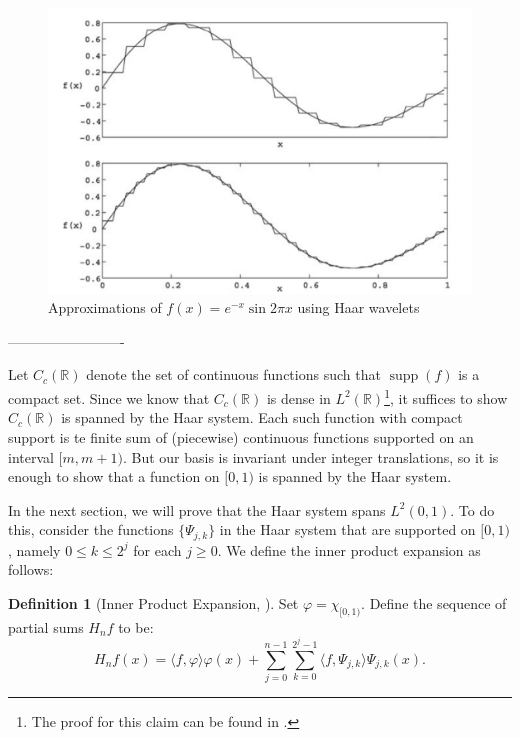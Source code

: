 \documentclass[2pt]{amsart}
\author{Jason Ngo}
\theoremstyle{theorem} %
\theoremstyle{definition}
\newtheorem{defn}[thm]{Definition}
\theoremstyle{example}
\theoremstyle{remark}
\numberwithin{equation}{section}
\newcommand{\R}{\mathbb{R}}
\DeclareMathOperator*{\supp}{supp}
\begin{document}
	
	
	\begin{figure}
		\centering
		\includegraphics[width=0.7\linewidth]{img/approximations}
		\caption{Approximations of $ f(x) = e^{-x} \sin{2\pi x} $ using Haar wavelets \cite{lepik}}
		\label{fig:approximations}
	\end{figure}
	
	
	-------------------------
	
	Let $ C_c (\R) $ denote the set of continuous functions such that $ \supp(f) $ is a compact set.
	Since we know that $ C_c(\R) $ is dense in $ L^2(\R) $\footnote{The proof for this claim can be found in \cite[326]{farrell}.}, it suffices to show $ C_c (\R) $ is spanned by the Haar system. Each such function with compact support is te finite sum of (piecewise) continuous functions supported on an interval $ [m, m+1) $. But our basis is invariant under integer translations, so it is enough to show that a function on $ [0,1) $ is spanned by the Haar system.
	
	\vspace{12pt}
	In the next section, we will prove that the Haar system spans $ L^2(0,1) $. To do this, consider the functions $ \{ \varPsi_{j,k} \} $ in the Haar system that are supported on $ [0,1) $, namely $ 0 \leq k \leq 2^j $ for each $ j \geq 0 $. We define the inner product expansion as follows:
	
	\begin{defn}[Inner Product Expansion, {\cite[409]{davidson}}] \label{def:expansion}
		Set $ \varphi = \chi_{[0,1)} $. Define the sequence of partial sums $ H_nf $ to be:
		\[ H_n f(x) = \langle f, \varphi \rangle \varphi(x) + \sum_{j=0}^{n-1} \sum_{k=0}^{2^j-1} \langle f, \varPsi_{j,k} \rangle \varPsi_{j,k} (x). \]
	\end{defn}
	
\end{document}
